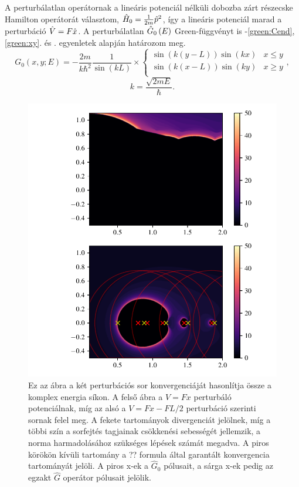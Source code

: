 A perturbálatlan operátornak a lineáris potenciál nélküli dobozba zárt részecske Hamilton operátorát választom, $\hat{H}_0=\frac{1}{2m}\hat{p}^2$, így a lineáris potenciál marad a perturbáció $\hat{V} = F\hat{x}$. A perturbálatlan $\hat{G}_0\left(E\right)$ Green-függvényt is -\ref{green:Cend}, \ref{green:xy}. és . egyenletek alapján határozom meg.
\begin{equation}
	G_0\left(x,y;E\right) = -\frac{2m}{k\hbar^2}\frac{1}{\sin\left(kL\right)}\times
	\begin{cases}
		\sin\left(k\left(y-L\right)\right)\sin\left(kx\right) & x\leq y\\
		\sin\left(k\left(x-L\right)\right)\sin\left(ky\right) & x\geq y\\
	\end{cases},
\end{equation}
\begin{equation}
	k = \frac{\sqrt{2mE}}{\hbar}.
\end{equation}
\begin{figure}[H]
	\centering
	\includegraphics[scale=1]{./figs/convergence3.pdf}
	\caption[Green-függvény perturbációs sorának konvergenciája]{Ez az ábra a két perturbációs sor konvergenciáját hasonlítja össze a komplex energia síkon. A felső ábra a $V=Fx$ perturbáló potenciálnak, míg az alsó a $V = Fx-FL/2$ perturbáció szerinti sornak felel meg. A fekete tartományok divergenciát jelölnek, míg a többi szín a sorfejtés tagjainak csökkenési sebességét jellemzik, a norma harmadolásához szükséges lépések számát megadva. A piros körökön kívüli tartomány a ?? formula által garantált konvergencia tartományát jelöli. A piros x-ek a $\hat{G}_0$ pólusait, a sárga x-ek pedig az egzakt $\hat{G}$ operátor pólusait jelölik.}
\end{figure}